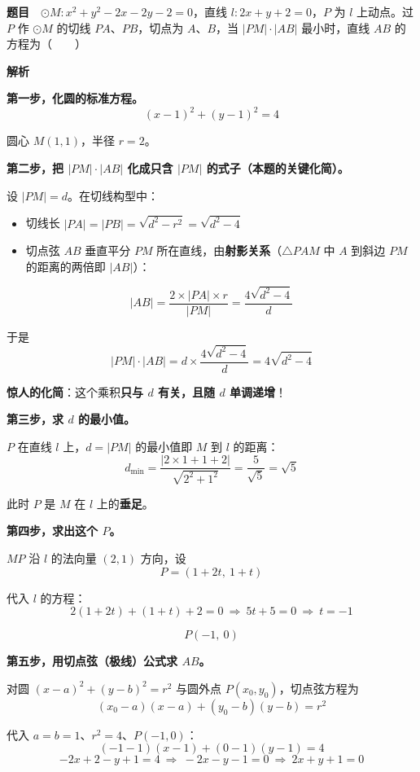 \par\medskip


\textbf{题目}　$\odot M:x^{2}+y^{2}-2x-2y-2=0$，直线 $l:2x+y+2=0$，$P$ 为 $l$ 上动点。过 $P$ 作 $\odot M$ 的切线 $PA$、$PB$，切点为 $A$、$B$，当 $|PM|\cdot|AB|$ 最小时，直线 $AB$ 的方程为（　　）

\textbf{解析}

\textbf{第一步，化圆的标准方程。}
\[(x-1)^{2}+(y-1)^{2}=4\]

圆心 $M(1,1)$，半径 $r=2$。

\textbf{第二步，把 $|PM|\cdot|AB|$ 化成只含 $|PM|$ 的式子（本题的关键化简）。}

设 $|PM|=d$。在切线构型中：
\begin{itemize}
\item 切线长 $|PA|=|PB|=\sqrt{d^{2}-r^{2}}=\sqrt{d^{2}-4}$
\item 切点弦 $AB$ 垂直平分 $PM$ 所在直线，由\textbf{射影关系}（$\triangle PAM$ 中 $A$ 到斜边 $PM$ 的距离的两倍即 $|AB|$）：
\end{itemize}
\[|AB|=\frac{2\times|PA|\times r}{|PM|}=\frac{4\sqrt{d^{2}-4}}d\]

于是
\[|PM|\cdot|AB|=d\times\frac{4\sqrt{d^{2}-4}}d=4\sqrt{d^{2}-4}\]

\textbf{惊人的化简}：这个乘积\textbf{只与 $d$ 有关，且随 $d$ 单调递增}！

\textbf{第三步，求 $d$ 的最小值。}

$P$ 在直线 $l$ 上，$d=|PM|$ 的最小值即 $M$ 到 $l$ 的距离：
\[d_{\min}=\frac{|2\times1+1+2|}{\sqrt{2^{2}+1^{2}}}=\frac5{\sqrt5}=\sqrt5\]

此时 $P$ 是 $M$ 在 $l$ 上的\textbf{垂足}。

\textbf{第四步，求出这个 $P$。}

$MP$ 沿 $l$ 的法向量 $(2,1)$ 方向，设
\[P=(1+2t,\ 1+t)\]

代入 $l$ 的方程：
\[2(1+2t)+(1+t)+2=0\ \Longrightarrow\ 5t+5=0\ \Longrightarrow\ t=-1\]

\[P(-1,\ 0)\]

\textbf{第五步，用切点弦（极线）公式求 $AB$。}

对圆 $(x-a)^{2}+(y-b)^{2}=r^{2}$ 与圆外点 $P\left(x_0,y_0\right)$，切点弦方程为
\[\left(x_0-a\right)(x-a)+\left(y_0-b\right)(y-b)=r^{2}\]

代入 $a=b=1$、$r^{2}=4$、$P(-1,0)$：
\[(-1-1)(x-1)+(0-1)(y-1)=4\]
\[-2x+2-y+1=4\ \Longrightarrow\ -2x-y-1=0\ \Longrightarrow\ 2x+y+1=0\]

